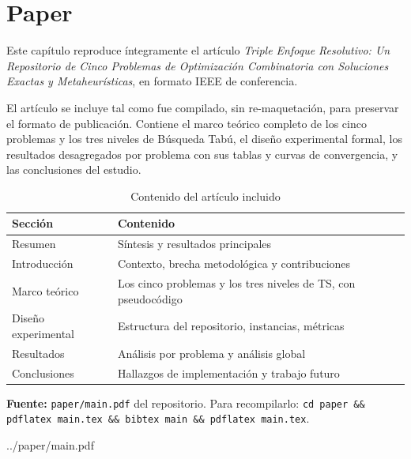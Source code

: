 \chapter{Paper}
\label{cap:paper}

Este capítulo reproduce íntegramente el artículo \emph{Triple Enfoque
Resolutivo: Un Repositorio de Cinco Problemas de Optimización Combinatoria
con Soluciones Exactas y Metaheurísticas}, en formato IEEE de conferencia.

El artículo se incluye tal como fue compilado, sin re-maquetación, para
preservar el formato de publicación. Contiene el marco teórico completo de
los cinco problemas y los tres niveles de Búsqueda Tabú, el diseño
experimental formal, los resultados desagregados por problema con sus tablas
y curvas de convergencia, y las conclusiones del estudio.

\begin{table}[H]
\centering
\caption{Contenido del artículo incluido}
\label{tab:contenido_paper}
\small
\begin{tabular}{ll}
\toprule
\textbf{Sección} & \textbf{Contenido} \\
\midrule
Resumen        & Síntesis y resultados principales \\
Introducción   & Contexto, brecha metodológica y contribuciones \\
Marco teórico  & Los cinco problemas y los tres niveles de TS, con
                 pseudocódigo \\
Diseño experimental & Estructura del repositorio, instancias, métricas \\
Resultados     & Análisis por problema y análisis global \\
Conclusiones   & Hallazgos de implementación y trabajo futuro \\
\bottomrule
\end{tabular}
\end{table}

\vfill
\noindent\textbf{Fuente:} \texttt{paper/main.pdf} del repositorio.
Para recompilarlo:
\texttt{cd paper \&\& pdflatex main.tex \&\& bibtex main \&\& pdflatex main.tex}.

\cleardoublepage

%
           {../paper/main.pdf}
